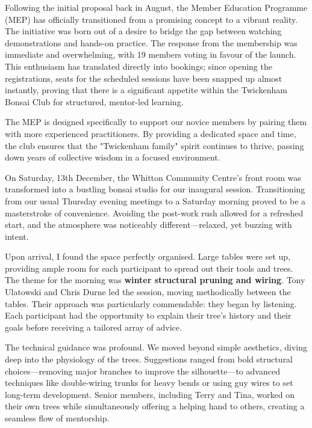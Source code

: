 \label{2025-12-workshop-mep}

\noindent
Following the initial proposal back in August, the Member Education Programme (MEP) has officially transitioned from a promising concept to a vibrant reality. The initiative was born out of a desire to bridge the gap between watching demonstrations and hands-on practice. The response from the membership was immediate and overwhelming, with 19 members voting in favour of the launch. This enthusiasm has translated directly into bookings; since opening the registrations, seats for the scheduled sessions have been snapped up almost instantly, proving that there is a significant appetite within the Twickenham Bonsai Club for structured, mentor-led learning.

The MEP is designed specifically to support our novice members by pairing them with more experienced practitioners. By providing a dedicated space and time, the club ensures that the "Twickenham family" spirit continues to thrive, passing down years of collective wisdom in a focused environment.

\medskip
{}
\noindent
On Saturday, 13th December, the Whitton Community Centre’s front room was transformed into a bustling bonsai studio for our inaugural session. Transitioning from our usual Thursday evening meetings to a Saturday morning proved to be a masterstroke of convenience. Avoiding the post-work rush allowed for a refreshed start, and the atmosphere was noticeably different—relaxed, yet buzzing with intent.

Upon arrival, I found the space perfectly organised. Large tables were set up, providing ample room for each participant to spread out their tools and trees. The theme for the morning was \textbf{winter structural pruning and wiring}. Tony Ulatowski and Chris Durne led the session, moving methodically between the tables. Their approach was particularly commendable: they began by listening. Each participant had the opportunity to explain their tree’s history and their goals before receiving a tailored array of advice.

The technical guidance was profound. We moved beyond simple aesthetics, diving deep into the physiology of the trees. Suggestions ranged from bold structural choices—removing major branches to improve the silhouette—to advanced techniques like double-wiring trunks for heavy bends or using guy wires to set long-term development. Senior members, including Terry and Tina, worked on their own trees while simultaneously offering a helping hand to others, creating a seamless flow of mentorship.


